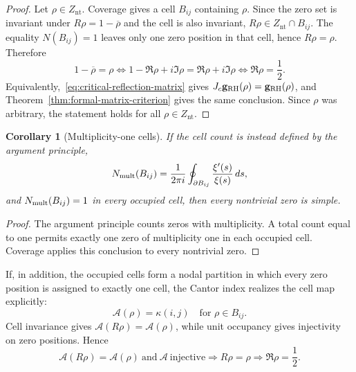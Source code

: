 \documentclass[11pt]{article}
\newtheorem{corollary}[definition]{Corollary}
\newcommand{\Znt}{Z_{\mathrm{nt}}}
\begin{document}
\begin{proof}
Let $\rho\in\Znt$.  Coverage gives a cell $B_{ij}$ containing $\rho$.  Since the zero set is
invariant under $R\rho=1-\overline\rho$ and the cell is also invariant,
$R\rho\in\Znt\cap B_{ij}$.  The equality $N(B_{ij})=1$ leaves only one zero position in
that cell, hence $R\rho=\rho$.  Therefore
\begin{equation}
 1-\overline\rho=\rho
 \iff 1-\Re\rho+i\Im\rho=\Re\rho+i\Im\rho
 \iff \Re\rho=\frac12.
\end{equation}
Equivalently,~\eqref{eq:critical-reflection-matrix} gives
$J_c\mathbf g_{\rm RH}(\rho)=\mathbf g_{\rm RH}(\rho)$, and
Theorem~\ref{thm:formal-matrix-criterion} gives the same conclusion.  Since $\rho$ was
arbitrary, the statement holds for all $\rho\in\Znt$.
\end{proof}

\begin{corollary}[Multiplicity-one cells]\label{cor:simple-zeros}
If the cell count is instead defined by the argument principle,
\begin{equation}\label{eq:cell-multiplicity-count}
 N_{\rm mult}(B_{ij})
 =\frac{1}{2\pi i}\oint_{\partial B_{ij}}\frac{\xi'(s)}{\xi(s)}\,ds,
\end{equation}
and $N_{\rm mult}(B_{ij})=1$ in every occupied cell, then every nontrivial zero is simple.
\end{corollary}

\begin{proof}
The argument principle counts zeros with multiplicity.  A total count equal to one permits
exactly one zero of multiplicity one in each occupied cell.  Coverage applies this conclusion
to every nontrivial zero.
\end{proof}

If, in addition, the occupied cells form a nodal partition in which every zero position is
assigned to exactly one cell, the Cantor index realizes the cell map explicitly:
\begin{equation}\label{eq:explicit-cell-map}
 \mathcal A(\rho)=\kappa(i,j)\quad\text{for }\rho\in B_{ij}.
\end{equation}
Cell invariance gives $\mathcal A(R\rho)=\mathcal A(\rho)$, while unit occupancy gives
injectivity on zero positions.  Hence
\begin{equation}\label{eq:heart-final-chain}
 \boxed{
 \mathcal A(R\rho)=\mathcal A(\rho)
 \ \text{and}\ \mathcal A\ \text{injective}
 \Longrightarrow R\rho=\rho
 \Longrightarrow \Re\rho=\frac12.}
\end{equation}
\end{document}

